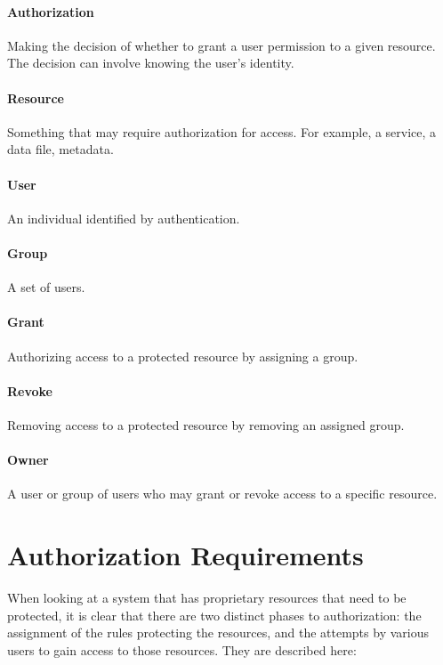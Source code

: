 \documentclass[11pt,a4paper]{ivoa}
\begin{document}
\paragraph{Authorization} Making the decision of whether to grant a user permission to a given resource.  The decision can involve knowing the user's identity.

\paragraph{Resource} Something that may require authorization for access.  For example, a service, a data file, metadata.

\paragraph{User} An individual identified by authentication.

\paragraph{Group} A set of users.

\paragraph{Grant} Authorizing access to a protected resource by assigning a group.

\paragraph{Revoke} Removing access to a protected resource by removing an assigned group.

\paragraph{Owner} A user or group of users who may grant or revoke access to a specific resource.

\section{Authorization Requirements}

When looking at a system that has proprietary resources that need to be protected, it is clear that there are two distinct phases to authorization:  the assignment of the rules protecting the resources, and the attempts by various users to gain access to those resources.  They are described here:
\end{document}
